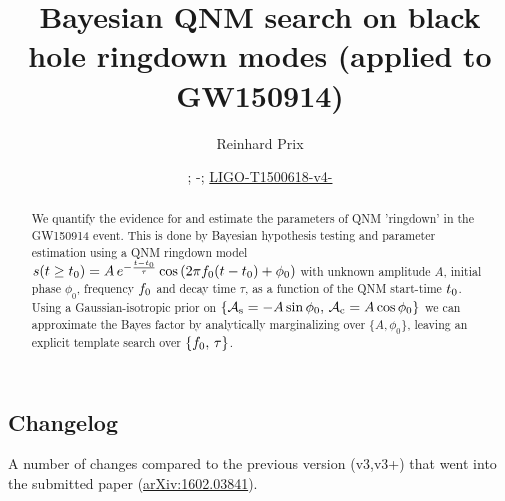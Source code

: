 \documentclass[aps,prd,onecolumn,notitlepage,nofootinbib,superscriptaddress,altaffilletter,floatfix]{revtex4-1}
\newcommand{\dcc}{LIGO-T1500618-v4-}
\begin{document}
\title{Bayesian QNM search on black hole ringdown modes (applied to GW150914)}


\author{Reinhard Prix}
\date{\commitDATE; \commitIDshort-\commitSTATUS; \href{https://dcc.ligo.org/LIGO-T1500618}{\dcc}}


\begin{abstract}
  We quantify the evidence for and estimate the parameters of QNM 'ringdown' in the GW150914 event.
  This is done by Bayesian hypothesis testing and parameter estimation using a QNM ringdown model
  $s(t\ge t_0) = A\,e^{-\frac{t-t_0}{\tau}}\cos\left(2\pi f_0 (t-t_0) + \phi_0\right)$ with unknown amplitude $A$, initial phase $\phi_0$,
  frequency $f_0$ and decay time $\tau$, as a function of the QNM start-time $t_0$.
  Using a Gaussian-isotropic prior on $\{\mathcal{A}_{\mathrm{s}}=-A\sin\phi_0,\,\mathcal{A}_{\mathrm{c}}=A\cos\phi_0\}$ we can approximate the Bayes factor by analytically marginalizing over
  $\{A,\phi_0\}$, leaving an explicit template search over $\{f_0,\,\tau\}$.
\end{abstract}

\maketitle

\subsection{Changelog}
\label{sec:changelog}

A number of changes compared to the previous version (v3,v3+) that went into the submitted paper (\href{http://arxiv.org/abs/1602.03841}{arXiv:1602.03841}).
\end{document}
